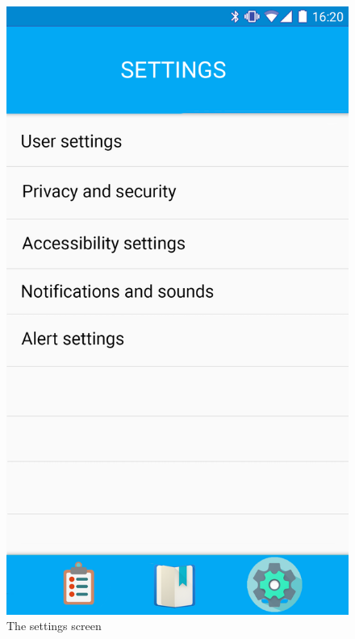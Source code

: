 \begin{figure}
\begin{minipage}{.5\textwidth}
\end{minipage}%
\begin{minipage}{.5\textwidth}
  \centering
  \includegraphics[width=0.9\linewidth]{../images/UI/Settings.png}
  \caption{\label{fig:settings}The settings screen}
\end{minipage}
\end{figure}
